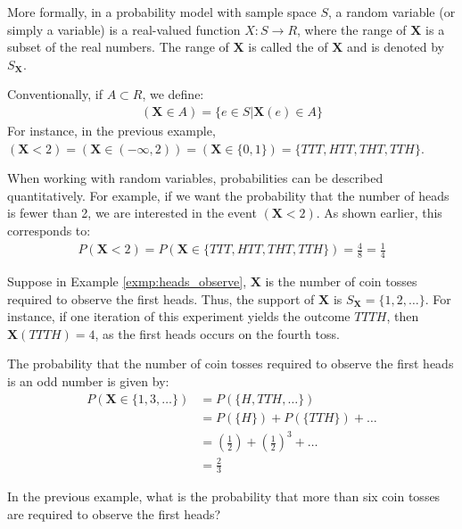 More formally, in a probability model with sample space \( S \),
a random variable (or simply a variable) is a real-valued function \( X: S \rightarrow R \),
where the range of \( \bm{X} \) is a subset of the real numbers.
The range of \( \bm{X} \) is called the  of \( \bm{X} \) and is denoted by \( S_{\bm{X}} \).

Conventionally, if \( A \subset R\), we define:
\begin{gather*}
    (\bm{X} \in A) = \{ e \in S | \bm{X}(e) \in A \}
\end{gather*}
For instance, in the previous example, \( (\bm{X} < 2) = (\bm{X} \in (-\infty, 2)) = (\bm{X} \in \{ 0, 1 \}) = \{ TTT, HTT, THT, TTH \} \).

When working with random variables, probabilities can be described quantitatively.
For example, if we want the probability that the number of heads is fewer than 2, we are interested in the event \( (\bm{X} < 2) \).
As shown earlier, this corresponds to:
\begin{gather*}
    P(\bm{X} < 2) = P(\bm{X} \in \{ TTT, HTT, THT, TTH \}) = \frac{4}{8} = \frac{1}{4}
\end{gather*}

\begin{exmp}
    Suppose in Example \autoref{exmp:heads_observe}, \( \bm{X} \) is the number of coin tosses required to observe the first heads.
    Thus, the support of \( \bm{X} \) is \( S_{\bm{X}} = \{ 1, 2, \ldots \} \).
    For instance, if one iteration of this experiment yields the outcome \( TTTH \),
    then \( \bm{X}(TTTH) = 4 \), as the first heads occurs on the fourth toss.

    The probability that the number of coin tosses required to observe the first heads is an odd number is given by:
    \begin{align*}
        P(\bm{X} \in \{ 1, 3, \ldots \}) &= P(\{ H, TTH, \ldots \})\\
        &= P(\{ H \}) + P(\{ TTH \}) + \ldots\\
        &= (\frac{1}{2}) + (\frac{1}{2})^3 + \ldots\\
        &= \frac{2}{3}
    \end{align*}
\end{exmp}

\begin{exmp}
    In the previous example, what is the probability that more than six coin tosses are required to observe the first heads?
\end{exmp}

